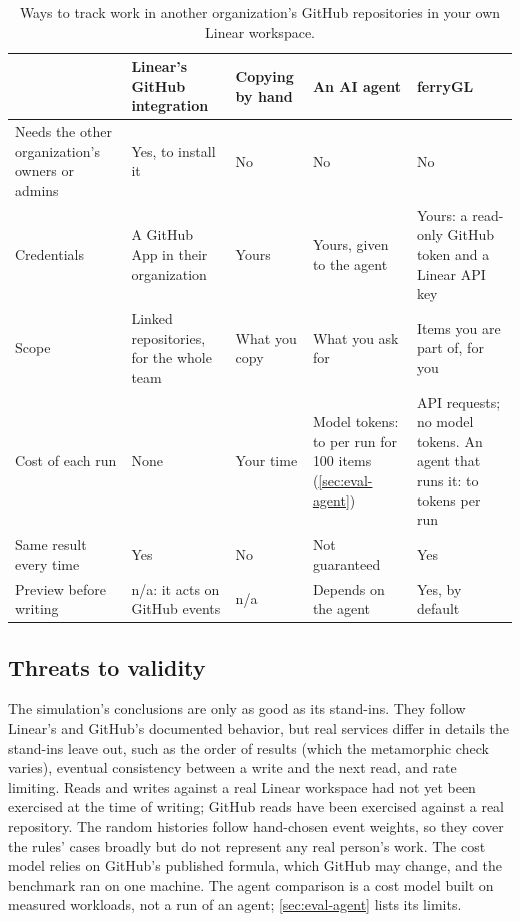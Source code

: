 \documentclass[11pt,a4paper]{article}
\newcommand{\ferry}{ferryGL}
\begin{document}
\begin{table}[t]
  \centering\small
  \caption{Ways to track work in another organization's GitHub repositories in your own
    Linear workspace.}
  \label{tab:compare}
  \begin{tabularx}{\linewidth}{@{}>{\raggedright\arraybackslash}p{3.3cm} >{\raggedright\arraybackslash}X >{\raggedright\arraybackslash}X >{\raggedright\arraybackslash}X >{\raggedright\arraybackslash}X@{}}
    \toprule
    & Linear's GitHub integration & Copying by hand & An AI agent & \ferry \\
    \midrule
    Needs the other organization's owners or admins & Yes, to install it & No & No & No \\
    Credentials & A GitHub App in their organization & Yours & Yours, given to the agent & Yours: a read-only GitHub token and a Linear API key \\
    Scope & Linked repositories, for the whole team & What you copy & What you ask for & Items you are part of, for you \\
    Cost of each run & None & Your time & Model tokens: \TokLeanOpusHundred{} to \TokPlausibleOpusHundred{} per run for 100 items (\cref{sec:eval-agent}) & API requests; no model tokens. An agent that runs it: \TokLeanDelegatingOpusHundred{} to \TokPlausibleDelegatingOpusHundred{} tokens per run \\
    Same result every time & Yes & No & Not guaranteed & Yes \\
    Preview before writing & n/a: it acts on GitHub events & n/a & Depends on the agent & Yes, by default \\
    \bottomrule
  \end{tabularx}
\end{table}

\subsection{Threats to validity}

The simulation's conclusions are only as good as its stand-ins. They follow Linear's and
GitHub's documented behavior, but real services differ in details the stand-ins leave out, such
as the order of results (which the metamorphic check varies), eventual consistency between a
write and the next read, and rate limiting. Reads and writes against a real Linear workspace had
not yet been exercised at the time of writing; GitHub reads have been exercised against a real
repository. The random histories follow hand-chosen event weights, so they cover the rules'
cases broadly but do not represent any real person's work. The cost model relies on GitHub's
published formula, which GitHub may change, and the benchmark ran on one machine. The agent
comparison is a cost model built on measured workloads, not a run of an agent;
\cref{sec:eval-agent} lists its limits.
\end{document}
